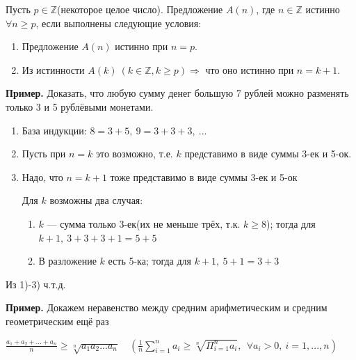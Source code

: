 \documentclass{article}
\begin{document}
    Пусть \(p \in \mathbb{Z}\)(некоторое целое число). Предложение \(A(n)\), где \(n \in \mathbb{Z}\) истинно \(\forall n \geq p\), если выполнены следующие условия:
    \begin{enumerate}
        \item Предложение \(A(n)\) истинно при \(n = p\).
        \item Из истинности \(A(k)\ (k \in \mathbb{Z}, k \geq p) \Rightarrow\) что оно истинно при \(n = k+1\).
    \end{enumerate}
    \textbf{Пример.} Доказать, что любую сумму денег большую 7 рублей можно разменять только 3 и 5 рублёвыми монетами.
    \begin{enumerate}
        \item База индукции: \(8 = 3 + 5,\ 9 = 3 + 3 + 3,\ ...\)
        \item Пусть при \(n = k\) это возможно, т.е. \(k\) представимо в виде суммы 3-ек и 5-ок.
        \item Надо, что \(n = k + 1\) тоже представимо в виде суммы 3-ек и 5-ок
        
        Для \(k\) возможны два случая:

        \begin{enumerate}
            \item \(k\) --- сумма только 3-ек(их не меньше трёх, т.к. \(k \geq 8\)); тогда для \(k + 1,\ 3 + 3 + 3 + 1 = 5 + 5\)
            \item В разложение \(k\) есть 5-ка; тогда для \(k + 1,\ 5 + 1 = 3 + 3\)
        \end{enumerate}
    \end{enumerate}
    Из 1)-3) ч.т.д.

    \textbf{Пример.} Докажем неравенство между средним арифметическим и средним геометрическим ещё раз

    \(\frac{a_1 + a_2 + ... + a_n}{n} \geq \sqrt[n]{a_1 a_2 ... a_n} \quad (\frac{1}{n} \sum_{i = 1}^n a_i \geq \sqrt[n]{\Pi_{i=1}^n a_i},\ \ \forall a_i > 0,\ i = 1, ..., n)\)
\end{document}
